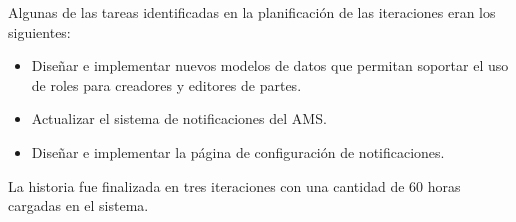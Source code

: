 Algunas de las tareas identificadas en la planificación de las iteraciones eran los siguientes:
\begin{itemize}
	\item Diseñar e implementar nuevos modelos de datos que permitan soportar el uso de roles para creadores y editores de partes.
	\item Actualizar el sistema de notificaciones del AMS.
	\item Diseñar e implementar la página de configuración de notificaciones.
\end{itemize}

La historia fue finalizada en tres iteraciones con una cantidad de 60 horas cargadas en el sistema.